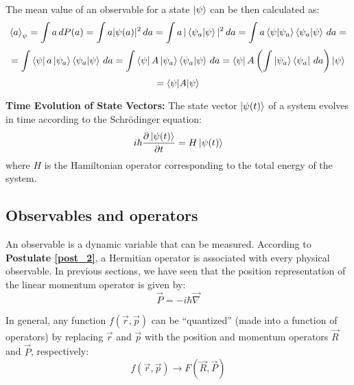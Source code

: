 \begin{postulate}
\begin{itemize}
        The mean value of an observable for a state $\ket{\psi}$ can be then calculated as:
        \begin{equation*}
            \braket{a}_\psi = \int a\, dP(a) = \int a|\psi(a)|^2\,da = \int a\,|\braket{\psi_a|\psi}|^2\,da = \int a\braket{\psi|\psi_a}\braket{\psi_a|\psi}\,da = 
        \end{equation*}
        \begin{equation*}
            = \int \bra{\psi}a\ket{\psi_a}\braket{\psi_a|\psi}\,da = \int \bra{\psi}A\ket{\psi_a}\braket{\psi_a|\psi}\,da = \bra{\psi}A\left(\int\ket{\psi_a}\bra{\psi_a}\,da\right)\ket{\psi}
        \end{equation*}
        \begin{equation}
            = \braket{\psi|A|\psi}
        \end{equation}

    \end{itemize}
\end{postulate}

\begin{postulate} \label{post_5}
    \textbf{Time Evolution of State Vectors:} The state vector $\ket{\psi(t)}$ of a system evolves in time according to the Schrödinger equation:
    \begin{equation}
        i\hbar\frac{\partial \ket{\psi(t)}}{\partial t} = H\ket{\psi(t)}
    \end{equation}
    where $H$ is the Hamiltonian operator corresponding to the total energy of the system.
\end{postulate}

\subsection{Observables and operators} \label{observables_and_operators}

An observable is a dynamic variable that can be measured. According to \textbf{Postulate \ref{post_2}}, a Hermitian operator is associated with every physical observable. In previous sections, we have seen that the position representation of the linear momentum operator is given by:
\begin{equation}
    \vec{P} = -i\hbar\vec{\nabla}
\end{equation}

In general, any function $f(\vec{r}, \vec{p})$ can be ``quantized'' (made into a function of operators) by replacing $\vec{r}$ and $\vec{p}$ with the position and momentum operators $\vec{R}$ and $\vec{P}$, respectively:
\begin{equation}
    f(\vec{r}, \vec{p}) \rightarrow F(\vec{R}, \vec{P})
\end{equation}

